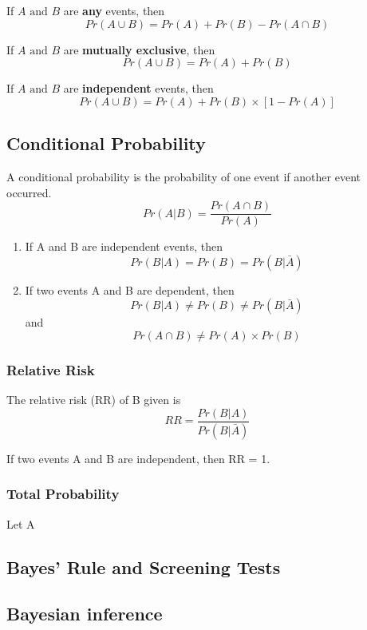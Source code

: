 \documentclass[12pt,]{article}
\providecommand{\tightlist}{%
  \setlength{\itemsep}{0pt}\setlength{\parskip}{0pt}}
\begin{document}
If \(A\text{ and }B\) are \textbf{any} events, then
\[Pr(A \cup B) = Pr(A)+ Pr(B)- Pr(A\cap B)\]

If \(A\text{ and }B\) are \textbf{mutually exclusive}, then
\[Pr(A \cup B) = Pr(A)+ Pr(B)\]

If \(A\text{ and }B\) are \textbf{independent} events, then
\[Pr(A \cup B) = Pr(A)+ Pr(B)\times[1-Pr(A)]\]

\hypertarget{conditional-probability}{%
\subsection{Conditional Probability}\label{conditional-probability}}

A conditional probability is the probability of one event if another
event occurred. \[Pr(A|B) = \frac{Pr(A\cap B)}{Pr(A)}\]

\begin{enumerate}
\def\labelenumi{\arabic{enumi}.}
\tightlist
\item
  If A and B are independent events, then
  \[Pr(B|A) = Pr(B) = Pr(B|\bar{A})\]
\item
  If two events A and B are dependent, then
  \[Pr(B|A)\ne Pr(B) \ne Pr(B|\bar{A})\] and
  \[Pr(A\cap B) \ne Pr(A)\times Pr(B)\]
\end{enumerate}

\hypertarget{relative-risk}{%
\subsubsection{Relative Risk}\label{relative-risk}}

The relative risk (RR) of B given is
\[RR=\frac{Pr(B|A)}{Pr(B|\bar{A})}\]

If two events A and B are independent, then RR = 1.

\hypertarget{total-probability}{%
\subsubsection{Total Probability}\label{total-probability}}

Let A

\hypertarget{bayes-rule-and-screening-tests}{%
\subsection{Bayes' Rule and Screening
Tests}\label{bayes-rule-and-screening-tests}}

\hypertarget{bayesian-inference}{%
\subsection{Bayesian inference}\label{bayesian-inference}}
\end{document}
